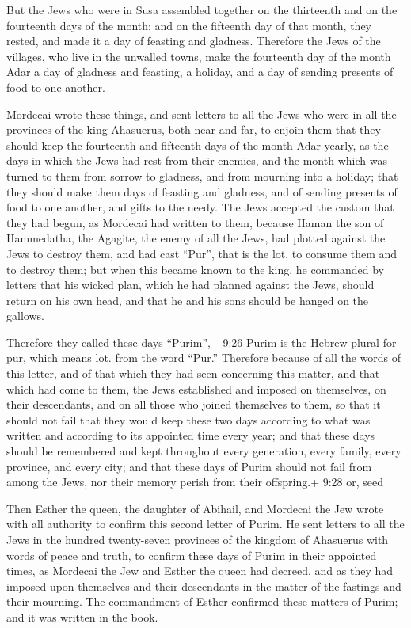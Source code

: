 But the Jews who were in Susa assembled together on the
thirteenth and on the fourteenth days of the month; and on the fifteenth
day of that month, they rested, and made it a day of feasting and
gladness.  Therefore the Jews of the villages, who live in
the unwalled towns, make the fourteenth day of the month Adar a day of
gladness and feasting, a holiday, and a day of sending presents of food
to one another.

 Mordecai wrote these things, and sent letters to all the
Jews who were in all the provinces of the king Ahasuerus, both near and
far,  to enjoin them that they should keep the fourteenth
and fifteenth days of the month Adar yearly,  as the days
in which the Jews had rest from their enemies, and the month which was
turned to them from sorrow to gladness, and from mourning into a
holiday; that they should make them days of feasting and gladness, and
of sending presents of food to one another, and gifts to the needy.
 The Jews accepted the custom that they had begun, as
Mordecai had written to them,  because Haman the son of
Hammedatha, the Agagite, the enemy of all the Jews, had plotted against
the Jews to destroy them, and had cast ``Pur'', that is the lot, to
consume them and to destroy them;  but when this became
known to the king, he commanded by letters that his wicked plan, which
he had planned against the Jews, should return on his own head, and that
he and his sons should be hanged on the gallows.

 Therefore they called these days ``Purim'',+ 9:26 Purim is
the Hebrew plural for pur, which means lot. from the word ``Pur.''
Therefore because of all the words of this letter, and of that which
they had seen concerning this matter, and that which had come to them,
 the Jews established and imposed on themselves, on their
descendants, and on all those who joined themselves to them, so that it
should not fail that they would keep these two days according to what
was written and according to its appointed time every year;
 and that these days should be remembered and kept
throughout every generation, every family, every province, and every
city; and that these days of Purim should not fail from among the Jews,
nor their memory perish from their offspring.+ 9:28 or, seed

 Then Esther the queen, the daughter of Abihail, and
Mordecai the Jew wrote with all authority to confirm this second letter
of Purim.  He sent letters to all the Jews in the hundred
twenty-seven provinces of the kingdom of Ahasuerus with words of peace
and truth,  to confirm these days of Purim in their
appointed times, as Mordecai the Jew and Esther the queen had decreed,
and as they had imposed upon themselves and their descendants in the
matter of the fastings and their mourning.  The commandment
of Esther confirmed these matters of Purim; and it was written in the
book.

